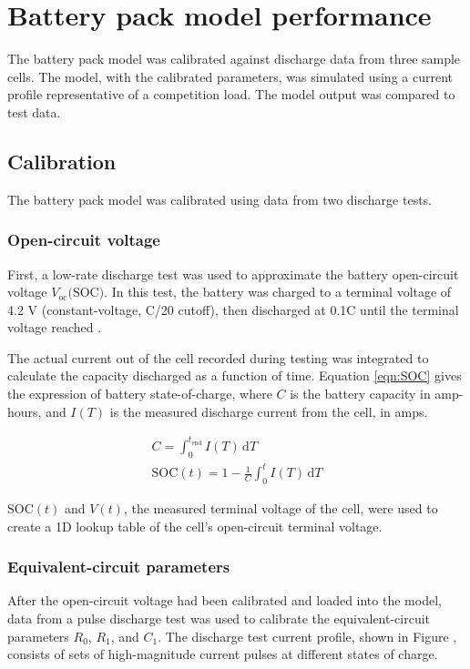 \documentclass[../SimBALink.tex]{subfiles}
\begin{document}
\section{Battery pack model performance}
	The battery pack model was calibrated against discharge data from three sample cells. The model, with the calibrated parameters, was simulated using a current profile representative of a competition load. The model output was compared to test data.
	\subsection{Calibration}
		The battery pack model was calibrated using data from two discharge tests.
		
		\subsubsection{Open-circuit voltage}
			First, a low-rate discharge test was used to approximate the battery open-circuit voltage $V_\text{oc}(\text{SOC)}$. In this test, the battery was charged to a terminal voltage of 4.2 V (constant-voltage, C/20 cutoff), then discharged at 0.1C until the terminal voltage reached . 
		
		
			The actual current out of the cell recorded during testing was integrated to calculate the capacity discharged as a function of time. Equation \ref{eqn:SOC} gives the expression of battery state-of-charge, where $C$ is the battery capacity in amp-hours, and $I(T)$ is the measured discharge current from the cell, in amps.
		
			\begin{gather}
				C = \int_0^{t_\text{end}} \! I(T) \, \mathrm{d}T				\\
				\text{SOC}(t) = 1 - \frac{1}{C} \int_0^{t} \! I(T) \, \mathrm{d}T
				\label{eqn:SOC}
			\end{gather} 
		
			$\text{SOC}(t)$ and $V(t)$, the measured terminal voltage of the cell, were used to create a 1D lookup table of the cell's open-circuit terminal voltage.
			
			\FloatBarrier
			
		\subsubsection{Equivalent-circuit parameters}
			After the open-circuit voltage had been calibrated and loaded into the model, data from a pulse discharge test was used to calibrate the equivalent-circuit parameters $R_0$, $R_1$, and $C_1$. The discharge test current profile, shown in Figure , consists of sets of high-magnitude current pulses at different states of charge.
			
\end{document}
